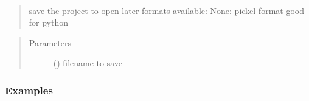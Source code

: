 \documentclass[letterpaper,10pt,english]{sphinxmanual}
\begin{document}
\begin{fulllineitems}
\begin{fulllineitems}
\label{\detokenize{index:TEMpcPlot.SeqIm.save}}~\begin{quote}

save the project to open later
formats available: None: pickel format good for python
\end{quote}
\begin{quote}\begin{description}
\item[{Parameters}] \leavevmode
{} () \textendash{} filename to save

\end{description}\end{quote}
\subsubsection*{Examples}

\begin{sphinxVerbatim}[commandchars=\\\{\}]
\end{sphinxVerbatim}

\end{fulllineitems}


\end{fulllineitems}

\end{document}
